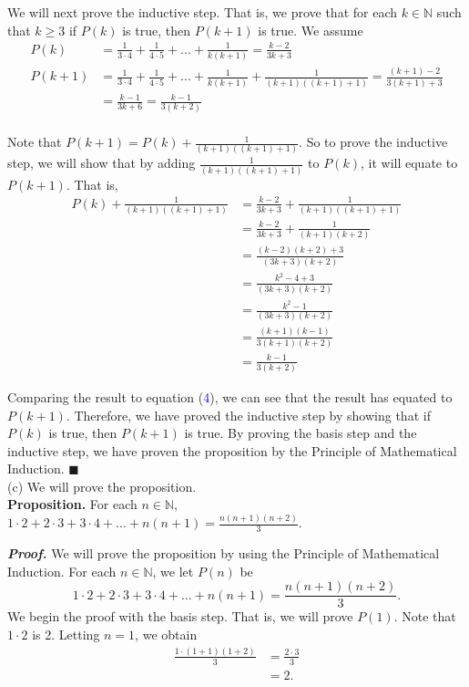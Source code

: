 \documentclass{article}
\begin{document}
We will next prove the inductive step. That is, we prove that for each $k \in \mathbb{N}$ such that $k \geq 3$ if $P(k)$ is true, then $P(k + 1)$ is true. We assume
\begin{align}
P(k) &= \frac{1}{3 \cdot 4} + \frac{1}{4 \cdot 5} + ... + \frac{1}{k(k + 1)} = \frac{k - 2}{3k + 3}\\
P(k + 1) &= \frac{1}{3 \cdot 4} + \frac{1}{4 \cdot 5} + ... + \frac{1}{k(k + 1)} + \frac{1}{(k + 1)((k + 1) + 1)} = \frac{(k + 1) - 2}{3(k + 1) + 3}\\
&= \frac{k - 1}{3k + 6} = \frac{k - 1}{3(k + 2)} \nonumber
\end{align} 
\\Note that $P(k + 1) = P(k) + \frac{1}{(k + 1)((k + 1) + 1)}$. So to prove the inductive step, we will show that by adding $\frac{1}{(k + 1)((k + 1) + 1)}$ to $P(k)$, it will equate to $P(k + 1)$. That is, 
\begin{align*}
P(k) + \frac{1}{(k + 1)((k + 1) + 1)} &= \frac{k - 2}{3k + 3} + \frac{1}{(k + 1)((k + 1) + 1)}\\
&= \frac{k - 2}{3k + 3} + \frac{1}{(k + 1)(k + 2)}\\
&= \frac{(k - 2)(k + 2) + 3}{(3k + 3)(k + 2)}\\
&= \frac{k^2 - 4 + 3}{(3k + 3)(k + 2)}\\
&= \frac{k^2 - 1}{(3k + 3)(k + 2)}\\
&= \frac{(k + 1)(k - 1)}{3(k + 1)(k + 2)}\\
&= \frac{k - 1}{3(k + 2)}
\end{align*}

Comparing the result to equation (\textcolor{blue}{4}), we can see that the result has equated to $P(k + 1)$. Therefore, we have proved the inductive step by showing that if $P(k)$ is true, then $P(k + 1)$ is true. By proving the basis step and the inductive step, we have proven the proposition by the Principle of Mathematical Induction. \hfill$\blacksquare$ \\

(c) We will prove the proposition.\\
\textbf{Proposition.} For each $n \in \mathbb{N}$, $1\cdot2 + 2\cdot3 + 3\cdot4 + ... + n(n + 1) = \frac{n(n + 1)(n + 2)}{3}$.

\textit{\textbf{Proof.}} We will prove the proposition by using the Principle of Mathematical Induction. For each $n \in \mathbb{N}$, we let $P(n)$ be
\begin{equation*}
1\cdot2 + 2\cdot3 + 3\cdot4 + ... + n(n + 1) = \frac{n(n + 1)(n + 2)}{3}.
\end{equation*}
 We begin the proof with the basis step. That is, we will prove $P(1)$. Note that $1 \cdot 2$ is 2. Letting $n = 1$, we obtain
\begin{align*}
\frac{1 \cdot (1 + 1)(1 + 2)}{3} &= \frac{2 \cdot 3}{3}\\
&= 2.
\end{align*}
\end{document}
